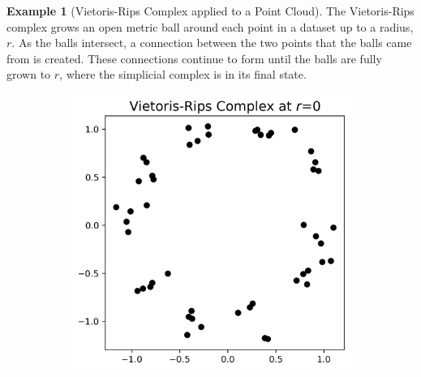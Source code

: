 \documentclass[ma]{uncgdissertationexp}
\theoremstyle{plain}
\theoremstyle{definition}
\newtheorem{example}[theorem]{Example}
\theoremstyle{remark}
\begin{document}
\newpage 
\begin{example}[Vietoris-Rips Complex applied to a Point Cloud]
\par The Vietoris-Rips complex grows an open metric ball around each point in a dataset up to a radius, $r$. As the balls intersect, a connection between the two points that the balls came from is created. These connections continue to form until the balls are fully grown to $r$, where the simplicial complex is in its final state.
\begin{figure}[H]
    \centering
    \begin{subfigure}[b]{0.22\textwidth}
        \centering
        \includegraphics[width=\textwidth]{point_cloud_plot_r0.png}
    \end{subfigure}
    \hfill
    \begin{subfigure}[b]{0.22\textwidth}
        \centering

\end{subfigure}
\end{figure}
\end{example}
\end{document}
